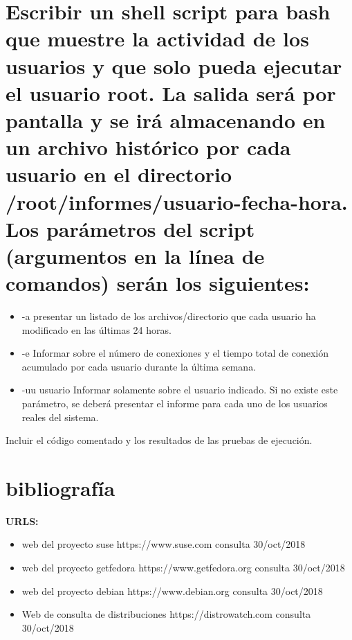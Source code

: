 \documentclass[preprint,11pt]{elsarticle}
\begin{document}
\clearpage
\section{Escribir un shell script para bash que muestre la actividad de los usuarios y que solo pueda ejecutar el usuario root. La salida será por pantalla y se irá almacenando en un archivo histórico por cada usuario en el directorio /root/informes/usuario-fecha-hora. Los parámetros del script (argumentos en la línea de comandos) serán los siguientes:}

\begin{itemize}
    \item-a presentar un listado de los archivos/directorio que cada usuario ha modificado en las últimas 24 horas.
    \item-e Informar sobre el número de conexiones y el tiempo total de conexión acumulado por cada usuario durante la última semana.
    \item-uu usuario Informar solamente sobre el usuario indicado. Si no existe este parámetro, se deberá presentar el informe para cada uno de los usuarios reales del sistema.
\end{itemize}

Incluir el código comentado y los resultados de las pruebas de ejecución.























\clearpage
\section{bibliografía}
    \textbf{URLS:}
    \begin{itemize}
        \item web del proyecto suse https://www.suse.com consulta 30/oct/2018
        \item web del proyecto getfedora https://www.getfedora.org consulta 30/oct/2018
        \item web del proyecto debian  https://www.debian.org consulta 30/oct/2018
        \item Web de consulta de distribuciones https://distrowatch.com consulta 30/oct/2018
    \end{itemize}
\end{document}
